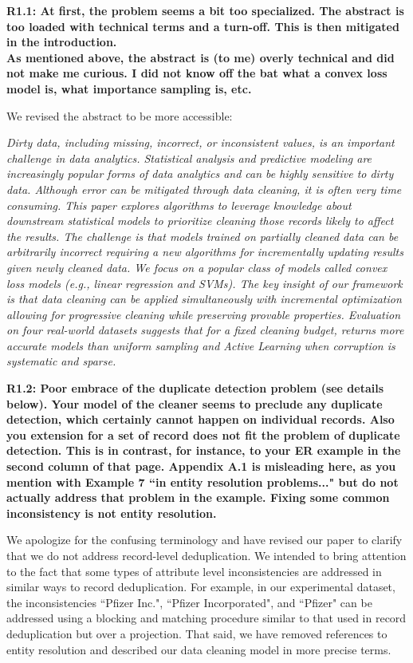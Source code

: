 \noindent\textbf{R1.1: At first, the problem seems a bit too specialized. The abstract is too loaded with technical terms and a turn-off. This is then mitigated in the introduction. \\
As mentioned above, the abstract is (to me) overly technical and did not make me curious. I did not know off the bat what a convex loss model is, what importance sampling is, etc.}

We revised the abstract to be more accessible:

\emph{Dirty data, including missing, incorrect, or inconsistent values, is an important challenge in data analytics.
Statistical analysis and predictive modeling are increasingly popular forms of data analytics and can be highly sensitive to dirty data.
Although error can be mitigated through data cleaning, it is often very time consuming.
This paper explores algorithms to leverage knowledge about downstream statistical models to prioritize cleaning those records likely to affect the results.
The challenge is that models trained on partially cleaned data can be arbitrarily incorrect requiring a new algorithms for incrementally updating results given newly cleaned data.
We focus on a popular class of models called convex loss models (e.g., linear regression and SVMs).
The key insight of our framework is that data cleaning can be applied simultaneously with incremental optimization allowing for progressive cleaning while preserving provable properties.
Evaluation on four real-world datasets suggests that for a fixed cleaning budget, \sys returns more accurate models than uniform sampling and Active Learning when corruption is systematic and sparse.  }

\vspace{0.5em}

\noindent\textbf{R1.2: Poor embrace of the duplicate detection problem (see details below). Your model of the cleaner seems to preclude any duplicate detection, which certainly cannot happen on individual records. Also you extension for a set of record does not fit the problem of duplicate detection. This is in contrast, for instance, to your ER example in the second column of that page. Appendix A.1 is misleading here, as you mention with Example 7 ``in entity resolution problems..." but do not actually address that problem in the example. Fixing some common inconsistency is not entity resolution.}

We apologize for the confusing terminology and have revised our paper to clarify that we do not address record-level deduplication.
We intended to bring attention to the fact that some types of attribute level inconsistencies are addressed in similar ways to record deduplication.
For example, in our experimental dataset, the inconsistencies ``Pfizer Inc.", ``Pfizer Incorporated", and ``Pfizer" can be addressed using a blocking and matching procedure similar to that used in record deduplication but over a projection.
That said, we have removed references to entity resolution and described our data cleaning model in more precise terms.

